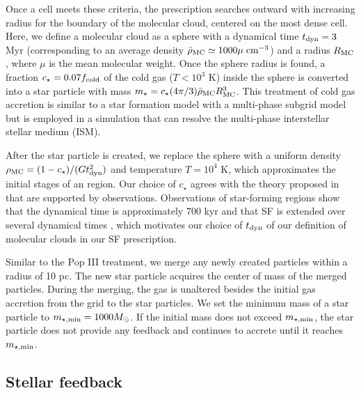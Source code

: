 \documentclass[12pt,preprint]{aastex}
\begin{document}
Once a cell meets these criteria, the prescription searches outward
with increasing radius for the boundary of the molecular cloud,
centered on the most dense cell.  Here, we define a molecular cloud as
a sphere with a dynamical time $t_{\rm dyn} = 3$ Myr (corresponding to
an average density $\bar{\rho}_{\rm MC} \simeq 1000\mu\; \cubecm$) and
a radius $R_{\rm MC}$, where $\mu$ is the mean molecular weight.  Once
the sphere radius is found, a fraction $c_\star = 0.07 f_{\rm cold}$
of the cold gas ($T < 10^3$ K) inside the sphere is converted into a
star particle with mass $m_\star = c_\star (4\pi/3) \bar{\rho}_{\rm
  MC} R_{\rm MC}^3$.  This treatment of cold gas accretion is similar
to a star formation model with a multi-phase subgrid model
\citep{Springel03b} but is employed in a simulation that can resolve
the multi-phase interstellar stellar medium (ISM).

After the star particle is created, we replace the sphere with a
uniform density $\rho_{\rm MC} = (1 - c_\star) / (Gt_{\rm dyn}^2)$ and
temperature $T = 10^4$ K, which approximates the initial stages of an
 region.  Our choice of $c_\star$ agrees with the theory
proposed in \citet{Krumholz05} that are supported by observations.
Observations of star-forming regions show that the dynamical time is
approximately 700 kyr and that SF is extended over several dynamical
times \citep[e.g.][]{Tan06}, which motivates our choice of $t_{\rm
  dyn}$ of our definition of molecular clouds in our SF prescription.

Similar to the Pop III treatment, we merge any newly created particles
within a radius of 10 pc.  The new star particle acquires the center
of mass of the merged particles.  During the merging, the gas is
unaltered besides the initial gas accretion from the grid to the star
particles.  We set the minimum mass of a star particle to $m_{\rm
  \star, min} = 1000 \Ms$.  If the initial mass does not exceed
$m_{\rm \star, min}$, the star particle does not provide any feedback
and continues to accrete until it reaches $m_{\rm \star, min}$.

\subsection{Stellar feedback}
\end{document}
